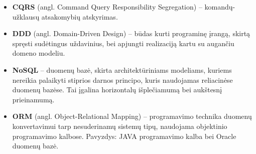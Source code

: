 \begin{itemize}

	\item \textbf{CQRS} (angl. Command Query Responsibility Segregation) – komandų-užklausų atsakomybių atskyrimas.

	\item \textbf{DDD} (angl. Domain-Driven Design) – būdas kurti programinę įrangą, skirtą spręsti sudėtingus uždavinius, bei apjungti realizaciją kartu su augančiu domeno modeliu.

	\item \textbf{NoSQL} – duomenų bazė, skirta architektūriniams modeliams, kuriems nereikia palaikyti stiprios darnos principo, kuris naudojamas reliacinėse duomenų bazėse. Tai įgalina horizontalų išplečiamumą bei aukštesnį prieinamumą.

	\item \textbf{ORM} (angl. Object-Relational Mapping) – programavimo technika duomenų konvertavimui tarp nesuderinamų sistemų tipų, naudojama objektinio programavimo kalbose. Pavyzdys: JAVA programavimo kalba bei Oracle duomenų bazė.

\end{itemize}